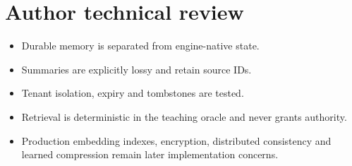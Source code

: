 \chapter*{Author technical review}
\begin{itemize}\item Durable memory is separated from engine-native state.\item Summaries are explicitly lossy and retain source IDs.\item Tenant isolation, expiry and tombstones are tested.\item Retrieval is deterministic in the teaching oracle and never grants authority.\item Production embedding indexes, encryption, distributed consistency and learned compression remain later implementation concerns.\end{itemize}
